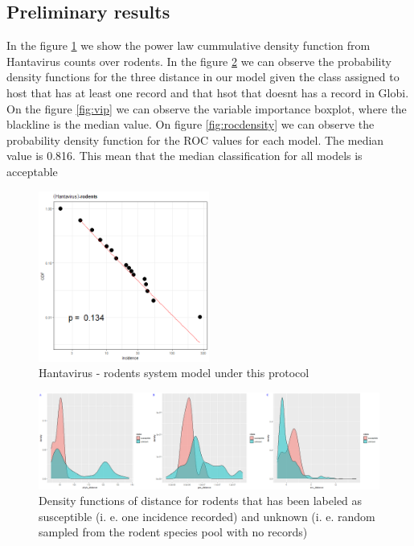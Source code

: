 \documentclass{article}
\begin{document}
\subsection*{Preliminary results}
In  the figure \ref{fig:powerlaw} we show the power law cummulative density function from Hantavirus counts over rodents. In the figure \ref{fig:density}  we can observe the probability density functions for the three distance in our model given the class assigned to host that has at least one record and that hsot that doesnt has a record in Globi. On the figure \ref{fig:vip} we can observe the variable importance boxplot, where the blackline is the median value. On figure \ref{fig:rocdensity} we can observe the probability density function for the ROC values for each model. The median value is 0.816. This mean that the median classification for all models is acceptable 


\begin{figure}[tbhp]
    \centering
    \includegraphics[width=0.5\textwidth]{01_fig_powerlaw}
    \caption{Hantavirus - rodents system model under this protocol}
    \label{fig:powerlaw}
\end{figure}

\begin{figure}[tbhp]
    \centering
    \includegraphics[width=1\textwidth]{02_density_functions.png}
    \caption{Density functions of distance for rodents that has been labeled as susceptible (i. e. one incidence recorded) and unknown (i. e. random sampled from the rodent species pool with no records)}
    \label{fig:density}
\end{figure}
\end{document}
